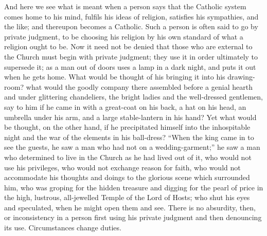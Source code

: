 And here we see what is meant when a person says that the Catholic
system comes home to his mind, fulfils his ideas of religion,
satisfies his sympathies, and the like; and thereupon becomes a
Catholic. Such a person is often said to go by private judgment, to be
choosing his religion by his own standard of what a religion ought to
be. Now it need not be denied that those who are external to the
Church must begin with private judgment; they use it in order
ultimately to supersede it; as a man out of doors uses a lamp in a
dark night, and puts it out when he gets home. What would be thought
of his bringing it into his drawing-room? what would the goodly
company there assembled before a genial hearth and under glittering
chandeliers, the bright ladies and the well-dressed gentlemen, say to
him if he came in with a great-coat on his back, a hat on his head, an
umbrella under his arm, and a large stable-lantern in his hand? Yet
what would be thought, on the other hand, if he precipitated himself
into the inhospitable night and the war of the elements in his
ball-dress? ``When the king came in to see the guests, he
saw a man who had not on a wedding-garment;'' he saw a man who
determined to live in the Church as he had lived out of it, who would
not use his privileges, who would not exchange reason for faith, who
would not accommodate his thoughts and doings to the glorious scene
which surrounded him, who was groping for the hidden treasure and
digging for the pearl of price in the high, lustrous, all-jewelled
Temple of the Lord of Hosts; who shut his eyes and speculated, when he
might open them and see. There is no absurdity, then, or inconsistency
in a person first using his private judgment and then denouncing its
use. Circumstances change duties.

